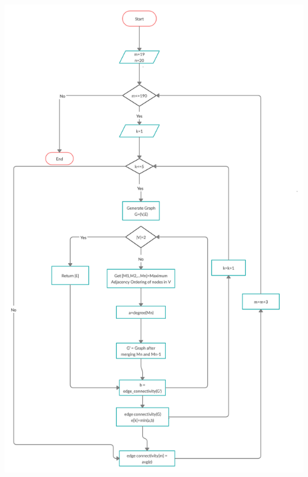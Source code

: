 \documentclass[12pt,letterpaper,titlepage,en-US]{article}
\begin{document}
\begin{itemize}
  \includegraphics[scale=0.2]{fig/flowchart.png}
\end{itemize}
\end{document}
